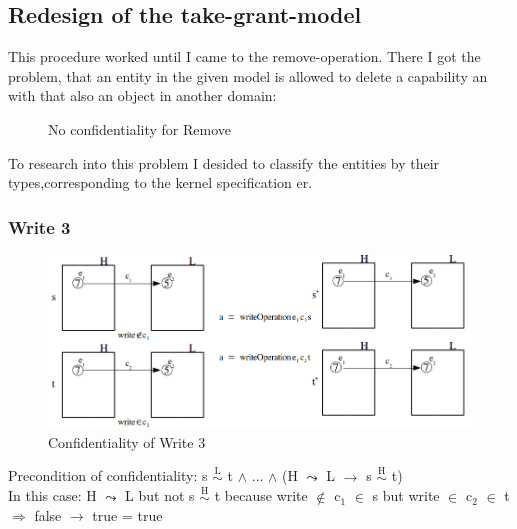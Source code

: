 \documentclass[pdftex,11pt,a4paper]{article}
\begin{document}
\subsection{Redesign of the take-grant-model}
This procedure worked until I came to the remove-operation. There I got the problem, that an entity in the given model is allowed to delete a capability an with that also an object in another domain:
\begin{figure}[H]
\caption{No confidentiality for Remove}
\end{figure}
To research into this problem I desided to classify the entities by their types,corresponding to the kernel specification er. 
\subsubsection{Write 3}\label{sec:Write 3}
\begin{figure}[H]
	\includegraphics[width=1.1\textwidth]{./Pictures/write3Confidentality.png}
		\caption[Confidentiality of Write 3]{Confidentiality of Write 3}
	\label{fig:write3}
\end{figure}
Precondition of confidentiality: 	s $\overset{\text{L}}{\sim}$ t $\wedge$ ... $\wedge$ (H  $\leadsto$ L $\rightarrow$ s $\overset{\text{H}}{\sim}$ t) \\
In this case: H  $\leadsto$ L but not s $\overset{\text{H}}{\sim}$ t because write $\notin$ c$_1$ $\in$ s but write $\in$ c$_2$ $\in$ t \\
$\Rightarrow$ false $\rightarrow$ true = true
\end{document}

